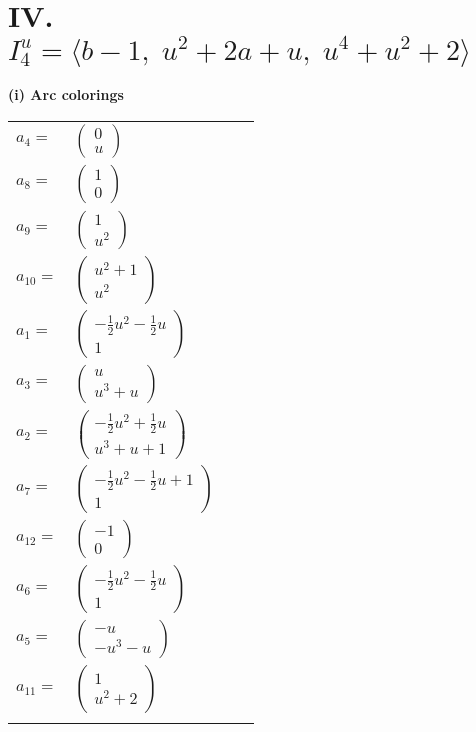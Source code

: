 \documentclass[1p]{elsarticle_modified}
\theoremstyle{definition}
\begin{document}
\centering \section*{IV. $I^u_{4}= \langle b-1,\;u^2+2 a+u,\;u^4+u^2+2 \rangle$}
\flushleft \textbf{(i) Arc colorings}\\
\begin{tabular}{m{7pt} m{180pt} m{7pt} m{180pt} }
\flushright $a_{4}=$&$\begin{pmatrix}0\\u\end{pmatrix}$ \\
\flushright $a_{8}=$&$\begin{pmatrix}1\\0\end{pmatrix}$ \\
\flushright $a_{9}=$&$\begin{pmatrix}1\\u^2\end{pmatrix}$ \\
\flushright $a_{10}=$&$\begin{pmatrix}u^2+1\\u^2\end{pmatrix}$ \\
\flushright $a_{1}=$&$\begin{pmatrix}-\frac{1}{2} u^2-\frac{1}{2} u\\1\end{pmatrix}$ \\
\flushright $a_{3}=$&$\begin{pmatrix}u\\u^3+u\end{pmatrix}$ \\
\flushright $a_{2}=$&$\begin{pmatrix}-\frac{1}{2} u^2+\frac{1}{2} u\\u^3+u+1\end{pmatrix}$ \\
\flushright $a_{7}=$&$\begin{pmatrix}-\frac{1}{2} u^2-\frac{1}{2} u+1\\1\end{pmatrix}$ \\
\flushright $a_{12}=$&$\begin{pmatrix}-1\\0\end{pmatrix}$ \\
\flushright $a_{6}=$&$\begin{pmatrix}-\frac{1}{2} u^2-\frac{1}{2} u\\1\end{pmatrix}$ \\
\flushright $a_{5}=$&$\begin{pmatrix}- u\\- u^3- u\end{pmatrix}$ \\
\flushright $a_{11}=$&$\begin{pmatrix}1\\u^2+2\end{pmatrix}$\\&\end{tabular}
\end{document}
